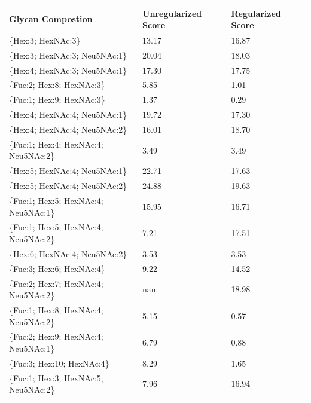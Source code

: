 \begin{table}
\begin{minipage}[t]{0.55\linewidth}
    \begin{footnotesize}
    \begin{tabular}{l|p{2cm} p{2cm}}
Glycan Compostion &  Unregularized Score &  Regularized Score \\
\hline
\{Hex:3; HexNAc:3\}                   &                13.17 &              16.87 \\
\{Hex:3; HexNAc:3; Neu5NAc:1\}        &                20.04 &              18.03 \\
\{Hex:4; HexNAc:3; Neu5NAc:1\}        &                17.30 &              17.75 \\
\{Fuc:2; Hex:8; HexNAc:3\}            &                 5.85 &               1.01 \\
\{Fuc:1; Hex:9; HexNAc:3\}            &                 1.37 &               0.29 \\
\{Hex:4; HexNAc:4; Neu5NAc:1\}        &                19.72 &              17.30 \\
\{Hex:4; HexNAc:4; Neu5NAc:2\}        &                16.01 &              18.70 \\
\{Fuc:1; Hex:4; HexNAc:4; Neu5NAc:2\} &                 3.49 &               3.49 \\
\{Hex:5; HexNAc:4; Neu5NAc:1\}        &                22.71 &              17.63 \\
\{Hex:5; HexNAc:4; Neu5NAc:2\}        &                24.88 &              19.63 \\
\{Fuc:1; Hex:5; HexNAc:4; Neu5NAc:1\} &                15.95 &              16.71 \\
\{Fuc:1; Hex:5; HexNAc:4; Neu5NAc:2\} &                 7.21 &              17.51 \\
\{Hex:6; HexNAc:4; Neu5NAc:2\}        &                 3.53 &               3.53 \\
\{Fuc:3; Hex:6; HexNAc:4\}            &                 9.22 &              14.52 \\
\{Fuc:2; Hex:7; HexNAc:4; Neu5NAc:2\} &                  nan &              18.98 \\
\{Fuc:1; Hex:8; HexNAc:4; Neu5NAc:2\} &                 5.15 &               0.57 \\
\{Fuc:2; Hex:9; HexNAc:4; Neu5NAc:1\} &                 6.79 &               0.88 \\
\{Fuc:3; Hex:10; HexNAc:4\}           &                 8.29 &               1.65 \\
\{Fuc:1; Hex:3; HexNAc:5; Neu5NAc:2\} &                 7.96 &              16.94 \\

\end{tabular}
\end{footnotesize}
\end{minipage}
\end{table}
